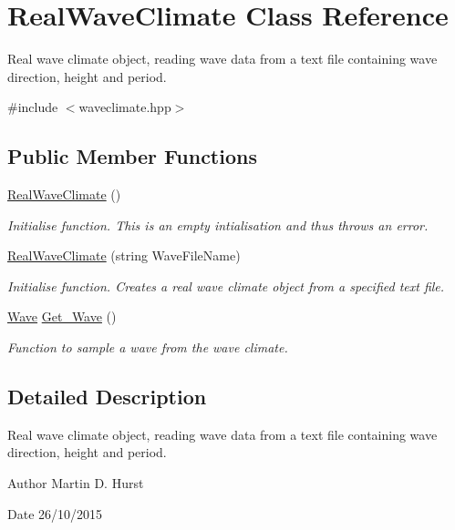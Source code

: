 \hypertarget{classRealWaveClimate}{\section{Real\-Wave\-Climate Class Reference}
\label{classRealWaveClimate}
}


Real wave climate object, reading wave data from a text file containing wave direction, height and period.  




{\ttfamily \#include $<$waveclimate.\-hpp$>$}

\subsection*{Public Member Functions}
\begin{DoxyCompactItemize}
\item 
\hyperlink{classRealWaveClimate_a6cd62899d9abe31203407efe5ab98964}{Real\-Wave\-Climate} ()
\begin{DoxyCompactList}\small\item\em Initialise function. This is an empty intialisation and thus throws an error. \end{DoxyCompactList}\item 
\hyperlink{classRealWaveClimate_aaec0f4a67f58040ebf67a41b5a794a12}{Real\-Wave\-Climate} (string Wave\-File\-Name)
\begin{DoxyCompactList}\small\item\em Initialise function. Creates a real wave climate object from a specified text file. \end{DoxyCompactList}\item 
\hyperlink{classWave}{Wave} \hyperlink{classRealWaveClimate_a9c1fb5012a825cf23f2702275f271913}{Get\-\_\-\-Wave} ()
\begin{DoxyCompactList}\small\item\em Function to sample a wave from the wave climate. \end{DoxyCompactList}\end{DoxyCompactItemize}


\subsection{Detailed Description}
Real wave climate object, reading wave data from a text file containing wave direction, height and period. 

\begin{DoxyAuthor}{Author}
Martin D. Hurst 
\end{DoxyAuthor}
\begin{DoxyDate}{Date}
26/10/2015 
\end{DoxyDate}


